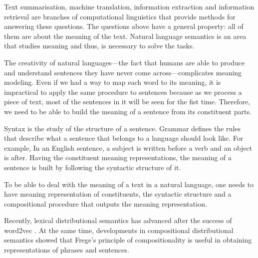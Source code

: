 Text summarisation, machine translation, information extraction and information retrieval are branches of computational linguistics that provide methods for answering these questions. The questions above have a general property: all of them are about the meaning of the text. Natural language semantics is an area that studies meaning and thus, is necessary to solve the tasks.

The creativity of natural languages---the fact that humans are able to produce and understand sentences they have never come across---complicates meaning modeling. Even if we had a way to map each word to its meaning, it is impractical to apply the same procedure to sentences because as we process a piece of text, most of the sentences in it will be seen for the fist time. Therefore, we need to be able to build the meaning of a sentence from its constituent parts.
%
%

Syntax is the study of the structure of a sentence. Grammar defines the rules that describe what a sentence that belongs to a language should look like. For example, In an English sentence, a subject is written before a verb and an object is after. Having the constituent meaning representations, the meaning of a sentence is built by following the syntactic structure of it.

To be able to deal with the meaning of a text in a natural language, one needs to have meaning representation of constituents, the syntactic structure and a compositional procedure that outputs the meaning representation.

Recently, lexical distributional semantics \cite{BullinariaLevy2012,Bullinaria2007,Turney:2010:FMV:1861751.1861756} has advanced after the success of word2vec \cite{mikolov2013linguistic,mikolov2013distributed,mikolov2013efficient}. At the same time, developments in compositional distributional semantics \cite{mitchell2010composition,maillard-clark-grefenstette:2014:TTNLS,Grefenstette:2011:ESC:2145432.2145580,Grefenstette:2011:ETV:2140490.2140497,kartsadrqpl2014,fried-polajnar-clark:2015:ACL-IJCNLP} showed that Frege's principle of compositionality \cite{Janssen2001} is useful in obtaining representations of phrases and sentences.
%
%
%

